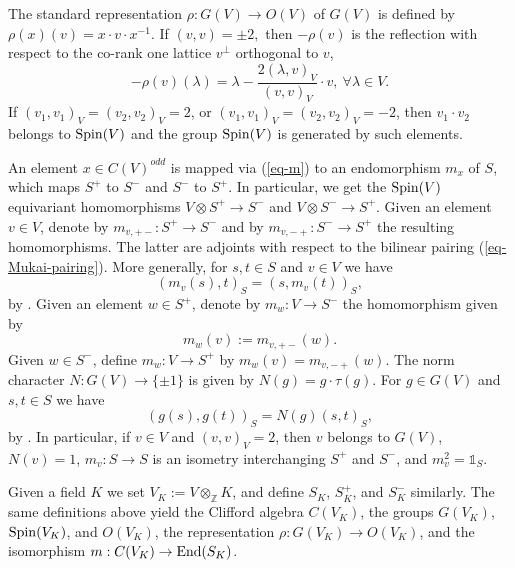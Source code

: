 \documentclass[12pt]{amsart}
\numberwithin{equation}{subsection}
\theoremstyle{plain}
\theoremstyle{definition}
\newcommand{\Integers}{{\mathbb Z}}
\newcommand{\Spin}{{\rm Spin}}
\newcommand{\End}{{\rm End}}
\newcommand{\one}{{\mathbb 1}}
\begin{document}
The standard representation $\rho:G(V)\rightarrow O(V)$ of $G(V)$  is defined by
$\rho(x)(v)=x\cdot v\cdot x^{-1}$. If $(v,v)=\pm 2,$
then $-\rho(v)$ is the reflection with respect to the co-rank one lattice $v^\perp$ orthogonal to $v$,
\[
-\rho(v)(\lambda)=\lambda-\frac{2(\lambda,v)_V}{(v,v)_V}\cdot v, \ \forall \lambda\in V.
\]
If $(v_1,v_1)_V=(v_2,v_2)_V=2$, or  $(v_1,v_1)_V=(v_2,v_2)_V=-2$, then $v_1\cdot v_2$ belongs to $\Spin(V)$ and the  group $\Spin(V)$ is generated by such elements.

An element $x\in C(V)^{odd}$ is mapped via (\ref{eq-m}) to an endomorphism $m_x$ of $S$, which maps $S^+$ to $S^-$ and $S^-$ to $S^+$. 
In particular, we get the $\Spin(V)$ equivariant homomorphisms
$V\otimes S^+\rightarrow S^-$ and $V\otimes S^-\rightarrow S^+$.
Given an element $v\in V$, denote by $m_{v,+-}:S^+\rightarrow S^-$ and by $m_{v,-+}:S^-\rightarrow S^+$ the resulting homomorphisms. The latter are adjoints with respect to the bilinear pairing (\ref{eq-Mukai-pairing}).
More generally, for $s, t\in S$ and $v\in V$ we have
\[
(m_v(s),t)_S=(s,m_v(t))_S,
\] 
by \cite[III.2.2]{chevalley}.
Given an element $w\in S^+$, denote by $m_w:V\rightarrow S^-$ the homomorphism given by
\[
m_w(v):=m_{v,+-}(w).
\]
Given $w\in S^-$, define $m_w:V\rightarrow S^+$ by $m_w(v)=m_{v,-+}(w)$. 
The norm character $N:G(V)\rightarrow \{\pm 1\}$ is given by $N(g)=g\cdot\tau(g)$. 
For $g\in G(V)$ and $s, t\in S$ we have
\[
(g(s),g(t))_S=N(g)(s,t)_S,
\]
by \cite[III.2.1]{chevalley}. In particular, if $v\in V$ and $(v,v)_V=2$, 
then $v$ belongs to $G(V)$, $N(v)=1$,  $m_v:S\rightarrow S$ is an isometry interchanging $S^+$ and $S^-$, and $m_v^2=\one_S$.

Given a field $K$ we set $V_K:=V\otimes_\Integers K$, and define $S_K$, $S^+_K$, and $S^-_K$ similarly.
The same definitions above yield the Clifford algebra $C(V_K)$, the groups $G(V_K)$, $\Spin(V_K)$, and 
$O(V_K)$, the representation $\rho:G(V_K)\rightarrow O(V_K)$, and the isomorphism
$m:C(V_K)\rightarrow \End(S_K)$. 


% 
\end{document}
